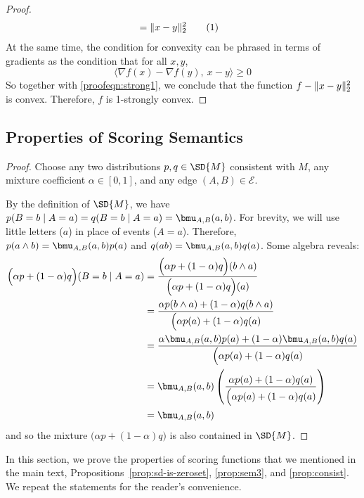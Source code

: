 \documentclass{article}
\theoremstyle{plain}
\theoremstyle{definition}
\theoremstyle{remark}
\DeclarePairedDelimiter{\norm}{\lVert}{\rVert}
\newcommand\numberthis{\addtocounter{equation}{1}\tag{\theequation}}
\newcommand{\Ed}{\mathcal E}
\numberwithin{equation}{section}
\begin{document}
{\begin{proof}
\begin{align*}
			&= \norm{x-y}^2_2 \numberthis\label{proofeqn:strong1}
	\end{align*}
	At the same time, the condition for convexity can be phrased in terms of gradients as the condition that for all $x,y$,
	\[  \Big\langle \nabla f(x) - \nabla f(y),~ x-y\Big\rangle \geq 0\]
	So together with \eqref{proofeqn:strong1}, we conclude that the function $f - \norm{x-y}^2_2$ is convex. Therefore, $f$ is 1-strongly convex.
\end{proof}

	}
	
\subsection{Properties of Scoring Semantics}


	\begin{vfull}
	\thmsetconvex*
	\begin{proof}
		Choose any two distributions $p, q \in \SD{M}$ consistent with $M$, any mixture coefficient $\alpha \in [0,1]$, and any edge $(A,B) \in \Ed$.
		
		By the definition of $\SD{M}$, we have $p(B = b \mid A = a) = q(B = b \mid A = a) = \bmu_{A,B}(a,b)$.  
		For brevity, we will use little letters ($a$) in place of events ($A = a$).
		Therefore, $p(a\land b) = \bmu_{A,B}(a,b) p(a)$ and $q(ab) = \bmu_{A,B}(a,b) q(a)$. Some algebra reveals:
		\begin{align*}
			\Big( \alpha p + (1-\alpha) q \Big) (B = b \mid A = a) &= 
			\frac{\Big( \alpha p + (1-\alpha) q \Big) (b \land a)}{\Big( \alpha p + (1-\alpha) q \Big) (a)} \\
			&= \frac{ \alpha p(b \land a) + (1-\alpha) q(b \land a) }{\Big( \alpha p(a) + (1-\alpha) q (a)} \\
			&= \frac{ \alpha \bmu_{A,B}(a,b) p(a) + (1-\alpha) \bmu_{A,B}(a,b) q(a) }{\Big( \alpha p(a) + (1-\alpha) q (a)} \\
			&=\bmu_{A,B}(a,b) \left(\frac{ \alpha  p(a) + (1-\alpha) q(a) }{\Big( \alpha p(a) + (1-\alpha) q (a)}\right)\\
			&= \bmu_{A,B}(a,b)
		\end{align*}
		and so the mixture $\Big(\alpha p + (1-\alpha) q \Big)$ is also contained in $\SD{M}$.
	\end{proof}
\end{vfull}
In this section, we prove the properties of scoring functions that we
mentioned in the main text,
Propositions~\ref{prop:sd-is-zeroset}, \ref{prop:sem3}, and
\ref{prop:consist}.  We repeat the statements for the reader's convenience.
\end{document}
